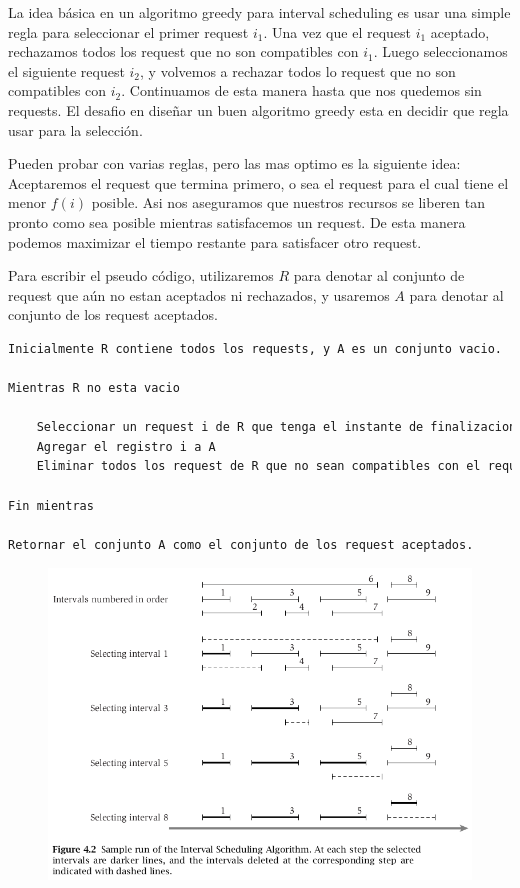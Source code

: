 \documentclass{article}
\begin{document}
La idea básica en un algoritmo greedy para interval scheduling es usar una simple regla para seleccionar el primer request \(i_1\). Una vez que el request \(i_1\) aceptado, rechazamos todos los request que no son compatibles con \(i_1\). Luego seleccionamos el siguiente request \(i_2\), y volvemos a rechazar todos lo request que no son compatibles con \(i_2\). 
Continuamos de esta manera hasta que nos quedemos sin requests. El desafio en diseñar un buen algoritmo greedy esta en decidir que regla usar para la selección.

Pueden probar con varias reglas, pero las mas optimo es la siguiente idea: Aceptaremos el request que termina primero, o sea el request para el cual tiene el menor \(f(i)\) posible. 
Asi nos aseguramos que nuestros recursos se liberen tan pronto como sea posible mientras satisfacemos un request. De esta manera podemos maximizar el tiempo restante para satisfacer otro request.

Para escribir el pseudo código, utilizaremos \(R\) para denotar al conjunto de request que aún no estan aceptados ni rechazados, y usaremos \(A\) para denotar al conjunto de los request aceptados.

\begin{lstlisting}[language=Python, caption=Algoritmo de greedy para Interval Scheduling]
Inicialmente R contiene todos los requests, y A es un conjunto vacio.

Mientras R no esta vacio

    Seleccionar un request i de R que tenga el instante de finalizacion mas chico.
    Agregar el registro i a A
    Eliminar todos los request de R que no sean compatibles con el request i    

Fin mientras

Retornar el conjunto A como el conjunto de los request aceptados.

\end{lstlisting}    


\begin{figure}[h!]
    \includegraphics[width=\linewidth]{imagenes/intervalos-compatibles.png}
\end{figure}
\end{document}
